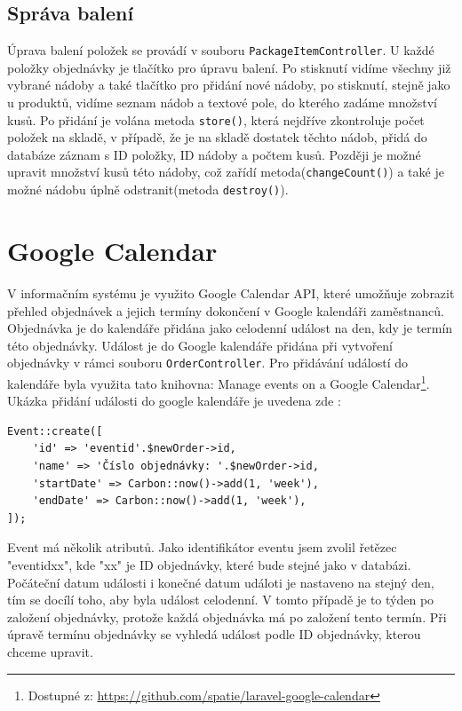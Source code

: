 \subsection{Správa balení}

Úprava balení položek se provádí v souboru \texttt{PackageItemController}. U každé položky objednávky je tlačítko pro úpravu balení. Po stisknutí vidíme všechny již vybrané nádoby a také tlačítko pro přidání nové nádoby, po stisknutí, stejně jako u produktů, vidíme seznam nádob a textové pole, do kterého zadáme množství kusů. Po přidání je volána metoda \texttt{store()}, která nejdříve zkontroluje počet položek na skladě, v případě, že je na skladě dostatek těchto nádob, přidá do databáze záznam s ID položky, ID nádoby a počtem kusů. Později je možné upravit množství kusů této nádoby, což zařídí metoda(\texttt{changeCount()}) a také je možné nádobu úplně odstranit(metoda \texttt{destroy()}).


\section{Google Calendar}

V informačním systému je využito Google Calendar API, které umožňuje zobrazit přehled objednávek a jejich termíny dokončení v Google kalendáři zaměstnanců. Objednávka je do kalendáře přidána jako celodenní událost na den, kdy je termín této objednávky. Událost je do Google kalendáře přidána při vytvoření objednávky v rámci souboru \texttt{OrderController}. Pro přidávání událostí do kalendáře byla využita tato knihovna: Manage events on a Google Calendar\footnote{Dostupné z: \url{https://github.com/spatie/laravel-google-calendar}}. Ukázka přidání události do google kalendáře je uvedena zde \cite{gitcalendar}: 

\begin{verbatim}
Event::create([
    'id' => 'eventid'.$newOrder->id,
    'name' => 'Číslo objednávky: '.$newOrder->id,
    'startDate' => Carbon::now()->add(1, 'week'),
    'endDate' => Carbon::now()->add(1, 'week'),
]);
\end{verbatim}



Event má několik atributů. Jako identifikátor eventu jsem zvolil řetězec "eventidxx", kde "xx" je ID objednávky, které bude stejné jako v databázi. Počáteční datum události i konečné datum událoti je nastaveno na stejný den, tím se docílí toho, aby byla událost celodenní. V tomto případě je to týden po založení objednávky, protože každá objednávka má po založení tento termín. Při úpravě termínu objednávky se vyhledá událost podle ID objednávky, kterou chceme upravit.

